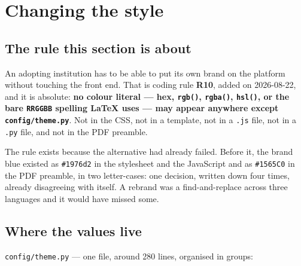 \documentclass[11pt]{article}
\newcommand{\rulename}[1]{\textbf{#1}}
\begin{document}
\clearpage
\section{Changing the style}
\label{sec:style}

\subsection{The rule this section is about}

An adopting institution has to be able to put its own brand on the platform without
touching the front end. That is coding rule \rulename{R10}, added on 2026-08-22, and it is
absolute: \textbf{no colour literal --- hex, \texttt{rgb()}, \texttt{rgba()},
\texttt{hsl()}, or the bare \texttt{RRGGBB} spelling \LaTeX{} uses --- may appear anywhere
except \texttt{config/theme.py}}. Not in the CSS, not in a template, not in a
\texttt{.js} file, not in a \texttt{.py} file, and not in the PDF preamble.

The rule exists because the alternative had already failed. Before it, the brand blue
existed as \texttt{\#1976d2} in the stylesheet and the JavaScript and as
\texttt{\#1565C0} in the PDF preamble, in two letter-cases: one decision, written down four
times, already disagreeing with itself. A rebrand was a find-and-replace across three
languages and it would have missed some.

\subsection{Where the values live}

\texttt{config/theme.py} --- one file, around 280 lines, organised in groups:
\end{document}
